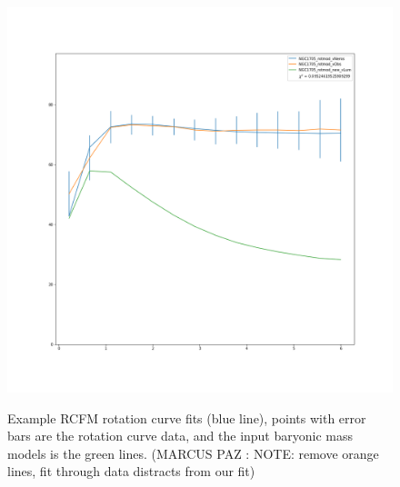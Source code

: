 \documentclass[reprint,%
 amsmath,amssymb,
 aps,
]{revtex4-1}
\begin{document}
\begin{figure}
\begin{minipage}{.5\textwidth}
  \label{fig:test2}
\end{minipage}
\begin{minipage}{.5\textwidth}
  \centering
  \includegraphics[width=.95\linewidth]{figures/NGC1705_rotmod_XueSofue.png}
  \label{fig:test1}
\end{minipage}
 \caption{Example  RCFM rotation curve fits (blue line), points with error bars are the rotation curve data, and the input baryonic mass models is  the green lines. (MARCUS PAZ : NOTE: remove orange lines, fit through data distracts from our fit)  }
\end{figure}
 
\end{document}
